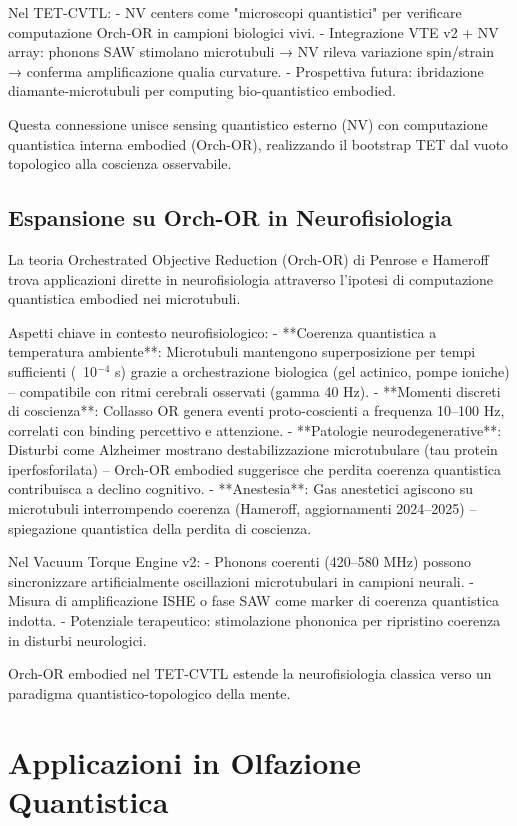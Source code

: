 \documentclass[11pt,a4paper]{article}
\begin{document}
Nel TET-CVTL:
- NV centers come "microscopi quantistici" per verificare computazione Orch-OR in campioni biologici vivi.
- Integrazione VTE v2 + NV array: phonons SAW stimolano microtubuli → NV rileva variazione spin/strain → conferma amplificazione qualia curvature.
- Prospettiva futura: ibridazione diamante-microtubuli per computing bio-quantistico embodied.

Questa connessione unisce sensing quantistico esterno (NV) con computazione quantistica interna embodied (Orch-OR), realizzando il bootstrap TET dal vuoto topologico alla coscienza osservabile.

\subsection{Espansione su Orch-OR in Neurofisiologia}

La teoria Orchestrated Objective Reduction (Orch-OR) di Penrose e Hameroff trova applicazioni dirette in neurofisiologia attraverso l'ipotesi di computazione quantistica embodied nei microtubuli.

Aspetti chiave in contesto neurofisiologico:
- **Coerenza quantistica a temperatura ambiente**: Microtubuli mantengono superposizione per tempi sufficienti (~10$^{-4}$ s) grazie a orchestrazione biologica (gel actinico, pompe ioniche) – compatibile con ritmi cerebrali osservati (gamma 40 Hz).
- **Momenti discreti di coscienza**: Collasso OR genera eventi proto-coscienti a frequenza 10–100 Hz, correlati con binding percettivo e attenzione.
- **Patologie neurodegenerative**: Disturbi come Alzheimer mostrano destabilizzazione microtubulare (tau protein iperfosforilata) – Orch-OR embodied suggerisce che perdita coerenza quantistica contribuisca a declino cognitivo.
- **Anestesia**: Gas anestetici agiscono su microtubuli interrompendo coerenza (Hameroff, aggiornamenti 2024–2025) – spiegazione quantistica della perdita di coscienza.

Nel Vacuum Torque Engine v2:
- Phonons coerenti (420–580 MHz) possono sincronizzare artificialmente oscillazioni microtubulari in campioni neurali.
- Misura di amplificazione ISHE o fase SAW come marker di coerenza quantistica indotta.
- Potenziale terapeutico: stimolazione phononica per ripristino coerenza in disturbi neurologici.

Orch-OR embodied nel TET-CVTL estende la neurofisiologia classica verso un paradigma quantistico-topologico della mente.

\section{Applicazioni in Olfazione Quantistica}
\end{document}
